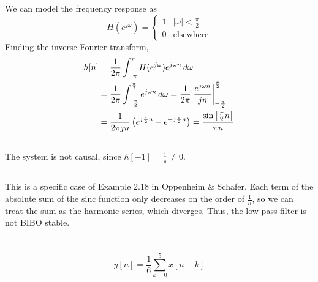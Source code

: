 \documentclass{article}
\begin{document}
We can model the frequency response as
\begin{equation}
    H(e^{j \omega}) =
    \begin{cases}
        1 & |\omega| < \frac{\pi}{2} \\
        0 & \text{elsewhere}
    \end{cases}
\end{equation}
Finding the inverse Fourier transform,
\begin{align}
    h[n] &= \frac{1}{2\pi} \int_{-\pi}^\pi H(e^{j \omega}) e^{j \omega n} \, d\omega \\
    &= \frac{1}{2\pi} \int_{-\frac{\pi}{2}}^{\frac{\pi}{2}} e^{j \omega n} \, d\omega = \frac{1}{2\pi} \eval{\frac{e^{j \omega n}}{jn}}_{-\frac{\pi}{2}}^{\frac{\pi}{2}} \\
    &= \frac{1}{2\pi j n} \left(e^{j \frac{\pi}{2} n} - e^{-j \frac{\pi}{2} n}\right) = \frac{\sin\left[\frac{\pi}{2} n\right]}{\pi n}
\end{align}

\subsection{}

The system is not causal, since \(h[-1] = \frac{1}{\pi} \neq 0\).

\subsection{}

This is a specific case of Example 2.18 in Oppenheim \& Schafer.
Each term of the absolute sum of the sinc function only decreases on the order of \(\frac{1}{n}\), so we can treat the sum as the harmonic series, which diverges.
Thus, the low pass filter is not BIBO stable.

\newpage
\section{}

\begin{equation}
    y[n] = \frac{1}{6} \sum_{k = 0}^5 x[n - k]
\end{equation}

\subsection{}
\end{document}
